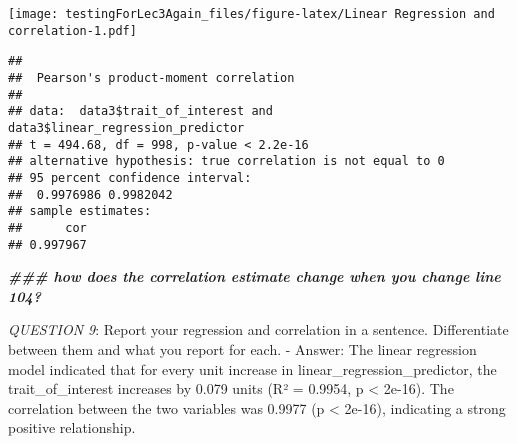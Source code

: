 \documentclass[
]{article}
\newenvironment{Shaded}{\begin{snugshade}}{\end{snugshade}}
\newcommand{\DocumentationTok}[1]{\textcolor[rgb]{0.56,0.35,0.01}{\textbf{\textit{#1}}}}
\newcommand{\FunctionTok}[1]{\textcolor[rgb]{0.13,0.29,0.53}{\textbf{#1}}}
\newcommand{\NormalTok}[1]{#1}
\newcommand{\SpecialCharTok}[1]{\textcolor[rgb]{0.81,0.36,0.00}{\textbf{#1}}}
\begin{document}
\texttt{[image: testingForLec3Again\_files/figure-latex/Linear Regression and correlation-1.pdf]}

\begin{Shaded}
\end{Shaded}

\begin{verbatim}
## 
##  Pearson's product-moment correlation
## 
## data:  data3$trait_of_interest and data3$linear_regression_predictor
## t = 494.68, df = 998, p-value < 2.2e-16
## alternative hypothesis: true correlation is not equal to 0
## 95 percent confidence interval:
##  0.9976986 0.9982042
## sample estimates:
##      cor 
## 0.997967
\end{verbatim}

\begin{Shaded}
\begin{Highlighting}[]
\DocumentationTok{\#\#\# how does the correlation estimate change when you change line 104?}
\end{Highlighting}
\end{Shaded}

\emph{QUESTION 9}: Report your regression and correlation in a sentence.
Differentiate between them and what you report for each. - Answer: The
linear regression model indicated that for every unit increase in
linear\_regression\_predictor, the trait\_of\_interest increases by
0.079 units (R² = 0.9954, p \textless{} 2e-16). The correlation between
the two variables was 0.9977 (p \textless{} 2e-16), indicating a strong
positive relationship.
\end{document}
